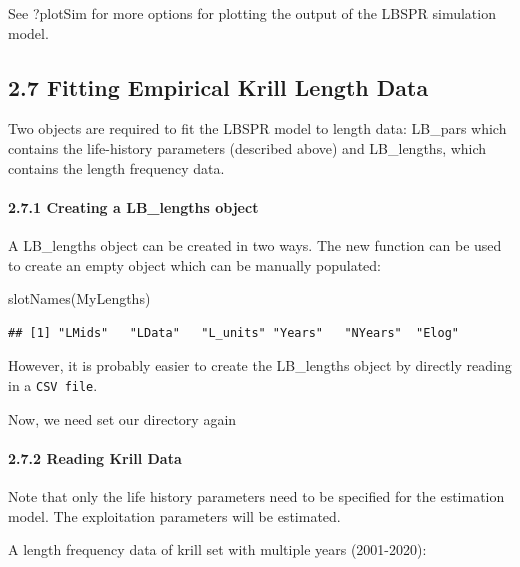 \documentclass[
]{article}
\newenvironment{Shaded}{\begin{snugshade}}{\end{snugshade}}
\newcommand{\FunctionTok}[1]{\textcolor[rgb]{0.00,0.00,0.00}{#1}}
\newcommand{\NormalTok}[1]{#1}
\begin{document}
See ?plotSim for more options for plotting the output of the LBSPR
simulation model.

\newpage

\hypertarget{fitting-empirical-krill-length-data}{%
\subsection{2.7 Fitting Empirical Krill Length
Data}\label{fitting-empirical-krill-length-data}}

Two objects are required to fit the LBSPR model to length data: LB\_pars
which contains the life-history parameters (described above) and
LB\_lengths, which contains the length frequency data.

\hypertarget{creating-a-lb_lengths-object}{%
\paragraph{2.7.1 Creating a LB\_lengths
object}\label{creating-a-lb_lengths-object}}

A LB\_lengths object can be created in two ways. The new function can be
used to create an empty object which can be manually populated:

\begin{Shaded}
\begin{Highlighting}[]
\FunctionTok{slotNames}\NormalTok{(MyLengths)}
\end{Highlighting}
\end{Shaded}

\begin{verbatim}
## [1] "LMids"   "LData"   "L_units" "Years"   "NYears"  "Elog"
\end{verbatim}

However, it is probably easier to create the LB\_lengths object by
directly reading in a \texttt{CSV\ file}.

Now, we need set our directory again

\hypertarget{reading-krill-data}{%
\paragraph{2.7.2 Reading Krill Data}\label{reading-krill-data}}

Note that only the life history parameters need to be specified for the
estimation model. The exploitation parameters will be estimated.

A length frequency data of krill set with multiple years (2001-2020):
\end{document}
